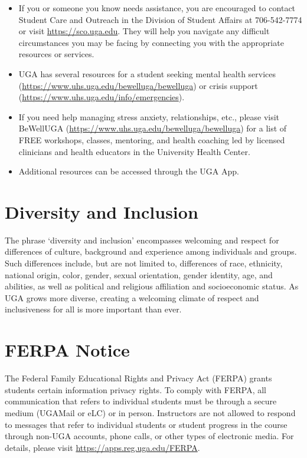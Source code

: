 \documentclass[12pt]{article}
\begin{document}
\begin{itemize}
  \item If you or someone you know needs assistance, you are
    encouraged to contact Student Care and Outreach in the Division of
    Student Affairs at 706-542-7774 or visit \url{https://sco.uga.edu}. They
    will help you navigate any difficult circumstances you may be facing
    by connecting you with the appropriate resources or services.
  \item UGA has several resources for a student seeking mental health
    services (\url{https://www.uhs.uga.edu/bewelluga/bewelluga}) or crisis
    support (\url{https://www.uhs.uga.edu/info/emergencies}).
  \item If you need help managing stress anxiety, relationships, etc.,
    please visit BeWellUGA (\url{https://www.uhs.uga.edu/bewelluga/bewelluga})
    for a list of FREE workshops, classes, mentoring, and health
    coaching led by licensed clinicians and health educators in the
    University Health Center.
  \item Additional resources can be accessed through the UGA App.
\end{itemize}


\vspace{-2mm}
\section*{\normalsize Diversity and Inclusion}
\vspace{-4mm}
The phrase ‘diversity and inclusion’ encompasses welcoming and respect
for differences of culture, background and experience among
individuals and groups. Such differences include, but are not limited
to, differences of race, ethnicity, national origin, color, gender,
sexual orientation, gender identity, age, and abilities, as well as
political and religious affiliation and socioeconomic status. As UGA
grows more diverse, creating a welcoming climate of respect and
inclusiveness for all is more important than ever. 



\vspace{-2mm}
\section*{\normalsize FERPA Notice}
\vspace{-4mm}

The Federal Family Educational Rights and Privacy Act (FERPA) grants
students certain information privacy rights. To comply with FERPA, all
communication that refers to individual students must be through a
secure medium (UGAMail or eLC) or in person. Instructors are not
allowed to respond to messages that refer to individual students or
student progress in the course through non-UGA accounts, phone calls,
or other types of electronic media. For details, please visit
\url{https://apps.reg.uga.edu/FERPA}. 
\end{document}
